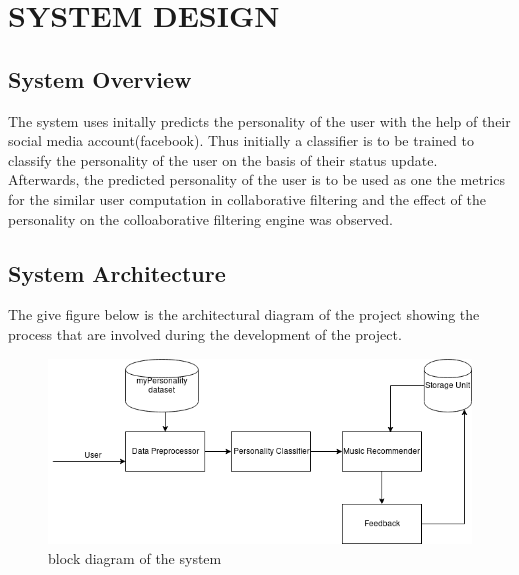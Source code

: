 \newpage
\section{SYSTEM DESIGN}

\subsection{System Overview}
The system uses initally predicts the personality of the user with the help of their social media account(facebook). Thus initially a classifier is to be trained to classify the personality of the user on the basis of their status update. Afterwards, the predicted personality of the user is to be used as one the metrics for the similar user computation in collaborative filtering and the effect of the personality on the colloaborative filtering engine was observed.

\subsection{System Architecture}
The give figure below is the architectural diagram of the project showing the process that are involved during the development of the project.

\begin{figure}[!ht]
\centering
\includegraphics[width = 16 cm]{fig/system.png}
\caption{block diagram of the system}
\label{fig:project}
\end{figure}

